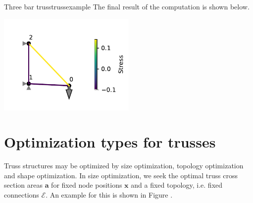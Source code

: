 \begin{example}{Three bar truss}{trussexample}
    The final result of the computation is shown below.
    
    \begin{center}
        \includegraphics[width=0.5\textwidth]{figures/three_bar_truss_solved.pdf}
    \end{center}    
\end{example}

\section{Optimization types for trusses}
Truss structures may be optimized by size optimization, topology optimization and shape optimization. In size optimization, we seek the optimal truss cross section areas $\mathbf{a}$ for fixed node positions $\mathbf{x}$ and a fixed topology, i.e. fixed connections $\mathcal{E}$. An example for this is shown in Figure .





 